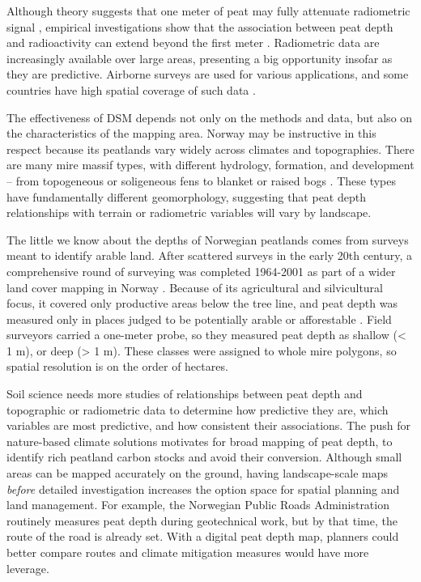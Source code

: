 \documentclass[soil, manuscript]{copernicus}
\begin{document}
Although theory suggests that one meter of peat may fully attenuate radiometric signal \citep{beamishGammaRayAttenuation2013, reinhardtGammaraySpectrometryVersatile2019}, empirical investigations show that the association between peat depth and radioactivity can extend beyond the first meter \citep{keaneySpatialStatisticsEstimate2013, gatisMappingUplandPeat2019, kogantiMappingPeatDepth2023}.
Radiometric data are increasingly available over large areas, presenting a big opportunity insofar as they are predictive.
Airborne surveys are used for various applications, and some countries have high spatial coverage of such data \citep{minasnyDigitalMappingPeatlands2019, baranwalAirborneGeophysicalSurveys2020}.

The effectiveness of DSM depends not only on the methods and data, but also on the characteristics of the mapping area.
Norway may be instructive in this respect because its peatlands vary widely across climates and topographies. There are many mire massif types, with different hydrology, formation, and development -- from topogeneous or soligeneous fens to blanket or raised bogs \citep{lyngstadBeskrivelserAvTorvmassivenheter2023}.
These types have fundamentally different geomorphology, suggesting that peat depth relationships with terrain or radiometric variables will vary by landscape.

The little we know about the depths of Norwegian peatlands comes from surveys meant to identify arable land.
After scattered surveys in the early 20th century, a comprehensive round of surveying was completed 1964-2001 as part of a wider land cover mapping in Norway \citep{bjordalMarkslagsklassifikasjonOkonomiskKartverk2007}.
Because of its agricultural and silvicultural focus, it covered only productive areas below the tree line, and peat depth was measured only in places judged to be potentially arable or afforestable \citep{ahlstromAR5Klassifikasjonssystem2019}.
Field surveyors carried a one-meter probe, so they measured peat depth as shallow (\textless{} 1 m), or deep (\textgreater{} 1 m).
These classes were assigned to whole mire polygons, so spatial resolution is on the order of hectares.

Soil science needs more studies of relationships between peat depth and topographic or radiometric data to determine how predictive they are, which variables are most predictive, and how consistent their associations.
The push for nature-based climate solutions motivates for broad mapping of peat depth, to identify rich peatland carbon stocks and avoid their conversion.
Although small areas can be mapped accurately on the ground, having landscape-scale maps \emph{before} detailed investigation increases the option space for spatial planning and land management.
For example, the Norwegian Public Roads Administration routinely measures peat depth during geotechnical work, but by that time, the route of the road is already set.
With a digital peat depth map, planners could better compare routes and climate mitigation measures would have more leverage.
\end{document}
